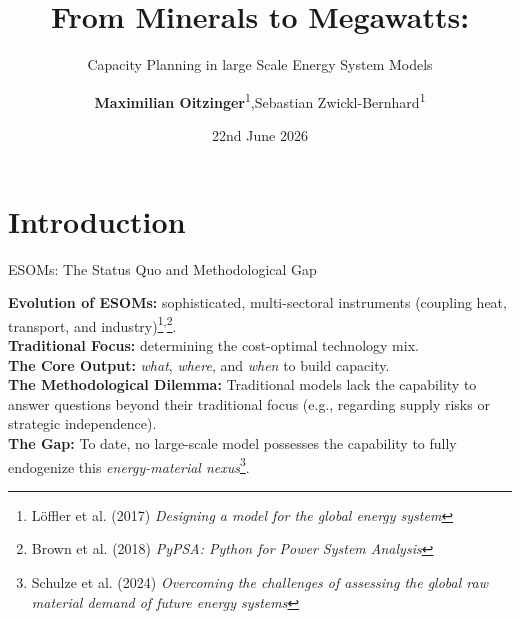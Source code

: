 \documentclass[10pt]{beamer}
\title{From Minerals to Megawatts:}
\subtitle{Capacity Planning in large Scale Energy System Models}
\author{\textbf{Maximilian Oitzinger}\textsuperscript{1},Sebastian Zwickl-Bernhard\textsuperscript{1}}
\institute{\textsuperscript{1}Energy Economics Group (EEG), Technische Universität Wien, Vienna, Austria}
\date{22nd June 2026}
\begin{document}

\begin{frame}[plain]
	\maketitle %
\end{frame}

\section{Introduction}
\begin{frame}{ESOMs: The Status Quo and Methodological Gap}
    
    \textcolor{metublue}{\textbf{Evolution of ESOMs:}} sophisticated, multi-sectoral instruments (coupling heat, transport, and industry)\footnote{\tiny Löffler et al. (2017) \textit{Designing a model for the global energy system}}\textsuperscript{,}\footnote{\tiny Brown et al. (2018) \textit{PyPSA: Python for Power System Analysis}}.\vspace{0.5cm}\\
    
    \textcolor{metublue}{\textbf{Traditional Focus:}} determining the cost-optimal technology mix.\vspace{0.5cm}\\
    
    \textcolor{metublue}{\textbf{The Core Output:}} \textit{what}, \textit{where}, and \textit{when} to build capacity.\vspace{0.5cm}\\
    
    \textcolor{metublue}{\textbf{The Methodological Dilemma:}} Traditional models lack the capability to answer questions beyond their traditional focus (e.g., regarding supply risks or strategic independence).\vspace{0.5cm}\\
    
    \textcolor{metublue}{\textbf{The Gap:}} To date, no large-scale model possesses the capability to fully endogenize this \textit{energy-material nexus}\footnote{\tiny Schulze et al. (2024) \textit{Overcoming the challenges of assessing the global raw material demand of future energy systems}}.\vspace{0.5cm}\\
\end{frame}
\end{document}
